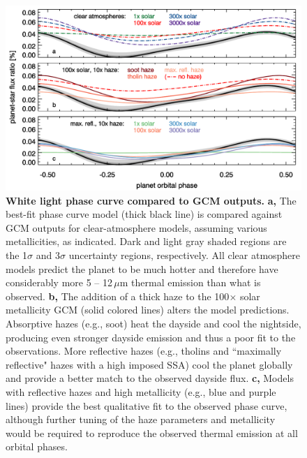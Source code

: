 \documentclass[pdflatex,sn-standardnature]{sn-jnl}%
\begin{document}
\begin{figure}[t]
    \centering
    \includegraphics[width=1\textwidth]{wl_phase_curve_models.pdf}
    \caption{\textbf{White light phase curve compared to GCM outputs.} \textbf{a,} The best-fit phase curve model (thick black line) is compared against GCM outputs for clear-atmosphere models, assuming various metallicities, as indicated.  Dark and light gray shaded regions are the 1$\sigma$ and 3$\sigma$ uncertainty regions, respectively. All clear atmosphere models predict the planet to be much hotter and therefore have considerably more 5 -- 12\,$\mu$m thermal emission than what is observed.  \textbf{b,} The addition of a thick haze to the 100$\times$ solar metallicity GCM (solid colored lines) alters the model predictions.  Absorptive hazes (e.g., soot) heat the dayside and cool the nightside, producing even stronger dayside emission and thus a poor fit to the observations.  More reflective hazes (e.g., tholins and ``maximally reflective" hazes with a high imposed SSA) cool the planet globally and provide a better match to the observed dayside flux.  \textbf{c,} Models with reflective hazes and high metallicity (e.g., blue and purple lines) provide the best qualitative fit to the observed phase curve, although further tuning of the haze parameters and metallicity would be required to reproduce the observed thermal emission at all orbital phases.}
    \label{fig:wl_models} 
\end{figure}
\end{document}
